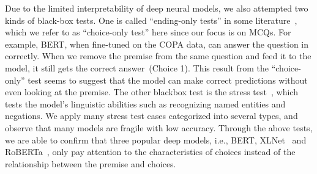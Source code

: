 Due to the limited interpretability of deep neural models, 
we also attempted two kinds of black-box tests.
One is called ``ending-only tests'' in some literature~\cite{endingonly1,endingonly2}, 
which we refer to as ``choice-only test'' here since our focus is 
on MCQs.
For example, BERT, when fine-tuned on the COPA data, can answer
the question in  correctly. When we remove the premise from 
the same question and feed it to the model, it still
gets the correct answer~(Choice 1). This result from the ``choice-only'' 
test seems to suggest that the model can make correct predictions
without even looking at the premise. 
The other blackbox test is the stress test~\cite{checklist2020acl}, 
which tests the model's linguistic abilities such as recognizing
named entities and negations.
We apply many stress test cases categorized into several types, 
and observe that many models are fragile with low accuracy.
Through the above tests, we are able to confirm that three popular deep models,
i.e., BERT, XLNet~\cite{xlnet2019nips} and RoBERTa~\cite{roberta2019}, 
only pay attention to the characteristics of choices instead of 
the relationship between the premise and choices.







%


